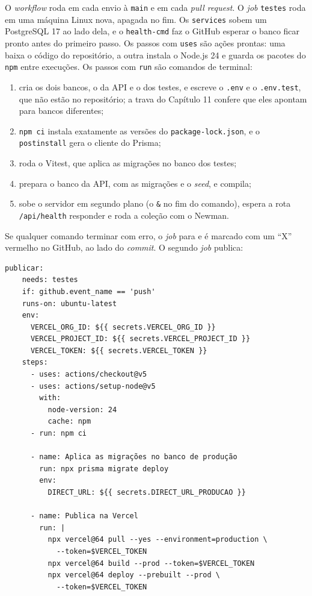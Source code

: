 O \textit{workflow} roda em cada envio à \texttt{main} e em cada \textit{pull request}. O \textit{job} \texttt{testes} roda em uma máquina Linux nova, apagada no fim. Os \texttt{services} sobem um PostgreSQL 17 ao lado dela, e o \texttt{health-cmd} faz o GitHub esperar o banco ficar pronto antes do primeiro passo. Os passos com \texttt{uses} são ações prontas: uma baixa o código do repositório, a outra instala o Node.js 24 e guarda os pacotes do \texttt{npm} entre execuções. Os passos com \texttt{run} são comandos de terminal:

\begin{enumerate}
  \item cria os dois bancos, o da API e o dos testes, e escreve o \texttt{.env} e o \texttt{.env.test}, que não estão no repositório; a trava do Capítulo 11 confere que eles apontam para bancos diferentes;
  \item \texttt{npm ci} instala exatamente as versões do \texttt{package-lock.json}, e o \texttt{postinstall} gera o cliente do Prisma;
  \item roda o Vitest, que aplica as migrações no banco dos testes;
  \item prepara o banco da API, com as migrações e o \textit{seed}, e compila;
  \item sobe o servidor em segundo plano (o \texttt{\&} no fim do comando), espera a rota \texttt{/api/health} responder e roda a coleção com o Newman.
\end{enumerate}

Se qualquer comando terminar com erro, o \textit{job} para e é marcado com um ``X'' vermelho no GitHub, ao lado do \textit{commit}. O segundo \textit{job} publica:

\begin{codigo}
\begin{Verbatim}[breaklines=true, breaksymbolleft={}, fontsize=\footnotesize]
  publicar:
    needs: testes
    if: github.event_name == 'push'
    runs-on: ubuntu-latest
    env:
      VERCEL_ORG_ID: ${{ secrets.VERCEL_ORG_ID }}
      VERCEL_PROJECT_ID: ${{ secrets.VERCEL_PROJECT_ID }}
      VERCEL_TOKEN: ${{ secrets.VERCEL_TOKEN }}
    steps:
      - uses: actions/checkout@v5
      - uses: actions/setup-node@v5
        with:
          node-version: 24
          cache: npm
      - run: npm ci

      - name: Aplica as migrações no banco de produção
        run: npx prisma migrate deploy
        env:
          DIRECT_URL: ${{ secrets.DIRECT_URL_PRODUCAO }}

      - name: Publica na Vercel
        run: |
          npx vercel@64 pull --yes --environment=production \
            --token=$VERCEL_TOKEN
          npx vercel@64 build --prod --token=$VERCEL_TOKEN
          npx vercel@64 deploy --prebuilt --prod \
            --token=$VERCEL_TOKEN
\end{Verbatim}
\end{codigo}

